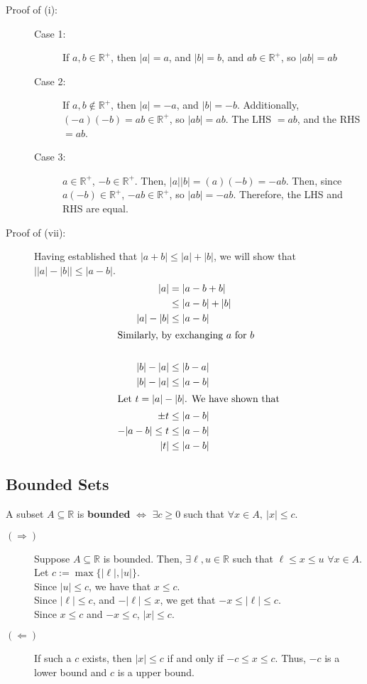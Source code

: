 \documentclass[10pt]{extarticle}
\newcommand{\R}{\mathbb{R}}
\begin{document}
      \begin{description}
        \item[Proof of (i):]\hfill
          \begin{description}
            \item[Case 1:] If $a,b\in\R^+$, then $|a| = a$, and $|b| = b$, and $ab \in \R^+$, so $|ab| = ab$
            \item[Case 2:] If $a,b\notin\R^+$, then $|a| = -a$, and $|b| = -b$. Additionally, $(-a)(-b)=ab \in\R^+$, so $|ab| = ab$. The LHS $=ab$, and the RHS $=ab$.
            \item[Case 3:] $a\in\R^+$, $-b\in\R^+$. Then, $|a||b| = (a)(-b) = -ab$. Then, since $a(-b)\in\R^+$, $-ab\in\R^+$, so $|ab| = -ab$. Therefore, the LHS and RHS are equal.
          \end{description}
        \item[Proof of (vii):] Having established that $|a+b| \leq |a| + |b|$, we will show that $\vert|a| - |b|\vert \leq |a-b|$.
          \begin{align*}
            |a| &= |a-b+b| \\
                &\leq |a-b| + |b| \\
            |a| - |b| &\leq |a-b|\\
            \shortintertext{Similarly, by exchanging $a$ for $b$}\\
            |b| - |a| &\leq |b-a|\\
            |b| - |a| &\leq |a-b|\\
            \shortintertext{Let $t = |a| - |b|$. We have shown that}
            \pm t &\leq |a-b|\\
            -|a-b| \leq t &\leq |a-b|\\
            |t| &\leq |a-b|
          \end{align*}
      \end{description}
  \subsection{Bounded Sets}%
    A subset $A\subseteq \R$ is \textbf{bounded} $\Leftrightarrow$  $\exists c \geq 0$ such that $\forall x\in A,~|x| \leq c$.
    \begin{description}
      \item[$(\Rightarrow)$] Suppose $A\subseteq \R$ is bounded. Then, $\exists \ell,u\in \R$ such that $\ell\leq x\leq u$ $\forall x\in A$. Let $c := \max\{|\ell|,|u|\}$.\\

        Since $|u| \leq c$, we have that $x\leq c$.\\

        Since $|\ell| \leq c$, and $-|\ell| \leq x$, we get that $-x \leq |\ell| \leq c$.\\

        Since $x\leq c$ and $-x\leq c$, $|x| \leq c$.
      \item[$(\Leftarrow)$] If such a $c$ exists, then $|x| \leq c$ if and only if $-c \leq x \leq c$. Thus, $-c$ is a lower bound and $c$ is a upper bound.
    \end{description}
\end{document}
